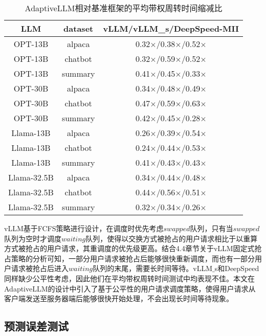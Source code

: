 \begin{table}[H]
  \centering
  \caption{AdaptiveLLM相对基准框架的平均带权周转时间缩减比}
  \label{Table:AdaptiveLLM相对于基准框架的平均带权周转时间缩减比}
  \renewcommand{\arraystretch}{1.25}
  \small
  \begin{tabular}{c c c}
    \toprule
    \textbf{LLM} & \textbf{dataset} & \textbf{vLLM/vLLM\_s/DeepSpeed-MII} \\
    \midrule
    OPT-13B	& alpaca & 0.32$\times$/0.38$\times$/0.52$\times$ \\
    OPT-13B	& chatbot & 0.32$\times$/0.59$\times$/0.52$\times$ \\
    OPT-13B	& summary & 0.41$\times$/0.45$\times$/0.33$\times$ \\
    OPT-30B	& alpaca & 0.34$\times$/0.48$\times$/0.49$\times$ \\
    OPT-30B	& chatbot & 0.47$\times$/0.59$\times$/0.63$\times$ \\
    OPT-30B	& summary & 0.42$\times$/0.45$\times$/0.28$\times$ \\
    Llama-13B & alpaca & 0.26$\times$/0.39$\times$/0.54$\times$ \\
    Llama-13B & chatbot & 0.24$\times$/0.44$\times$/0.53$\times$ \\
    Llama-13B & summary & 0.41$\times$/0.43$\times$/0.43$\times$ \\
    Llama-32.5B & alpaca & 0.34$\times$/0.44$\times$/0.48$\times$ \\
    Llama-32.5B & chatbot & 0.44$\times$/0.56$\times$/0.51$\times$ \\
    Llama-32.5B & summary & 0.32$\times$/0.34$\times$/0.26$\times$ \\
    \bottomrule
  \end{tabular}
\end{table}

vLLM基于FCFS策略进行设计，在调度时优先考虑$swapped$队列，只有当$swapped$队列为空时才调度$waiting$队列，使得以交换方式被抢占的用户请求相比于以重算方式被抢占的用户请求，其重调度的优先级更高。结合4.4章节关于vLLM固定式抢占策略的分析可知，一部分用户请求被抢占后能够很快重新调度，而也有一部分用户请求被抢占后进入$waiting$队列的末尾，需要长时间等待。vLLM$\_$s和DeepSpeed同样缺少公平性考虑，因此他们在平均带权周转时间测试中均表现不佳。本文在AdaptiveLLM的设计中引入了基于公平性的用户请求调度策略，使得用户请求从客户端发送至服务器端后能够很快开始处理，不会出现长时间等待现象。

\subsection{预测误差测试}

